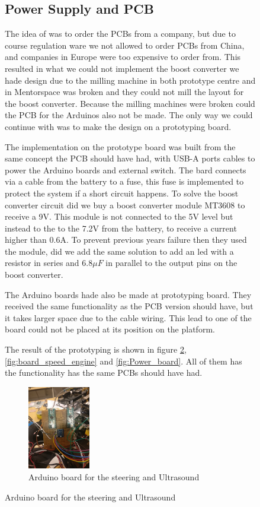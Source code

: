 \documentclass[11pt, titlepage]{article} %
\begin{document}
\begin{figure}
\subsection{Power Supply and PCB}

The idea of was to order the PCBs from a company, but due to course regulation ware we not allowed to order PCBs from China, and companies in Europe were too expensive to order from. This resulted in what we could not implement the boost converter we hade design due to the milling machine in both prototype centre and in Mentorspace was broken and they could not mill the layout for the boost converter. Because the milling machines were broken could the PCB for the Arduinos also not be made. The only way we could continue with was to make the design on a prototyping board. 

The implementation on the prototype board was built from the same concept the PCB should have had, with USB-A ports cables to power the Arduino boards and external switch. The bard connects via a cable from the battery to a fuse, this fuse is implemented to protect the system if a short circuit happens. To solve the boost converter circuit did we buy a boost converter module MT3608 to receive a 9V. This module is not connected to the 5V level but instead to the to the 7.2V from the battery, to receive a current higher than 0.6A. To prevent previous years failure then they used the module, did we add the same solution to add an led with a resistor in series and $ 6.8\mu F$ in parallel to the output pins on the boost converter.

The Arduino boards hade also be made at prototyping board. They received the same functionality as the PCB version should have, but it takes larger space due to the cable wiring. This lead to one of the board could not be placed at its position on the platform. 

The result of the prototyping is shown in figure \ref{fig:board_ultra_steering}, \ref{fig:board_speed_engine} and \ref{fig:Power_board}. All of them has the functionality has the same PCBs should have had. 


\begin{figure}
	\includegraphics[width=0.3\textwidth]{arduino1.jpg}
	\caption{Arduino board for the steering and Ultrasound}
	\label{fig:board_ultra_steering}
\end{figure}


\end{figure}
\end{document}
